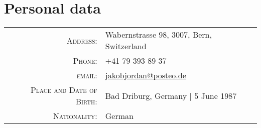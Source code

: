 \section{Personal data}

\begin{longtable}{rl}
\textsc{Address:} & Wabernstrasse 98, 3007, Bern, Switzerland \\
\textsc{Phone:} & +41 79 393 89 37 \\
\textsc{email:} & \href{mailto:jakobjordan@posteo.de}{jakobjordan@posteo.de} \\
\textsc{Place and Date of Birth:} & Bad Driburg, Germany | 5 June 1987 \\
\textsc{Nationality:} & German
\end{longtable}

